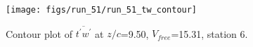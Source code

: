 \begin{figure}[H]
\centering
\texttt{[image: figs/run\_51/run\_51\_tw\_contour]}
\caption{Contour plot of $\overline{t^\prime w^\prime}$ at $z/c$=9.50, $V_{free}$=15.31, station 6.}
\label{fig:run_51_tw_contour}
\end{figure}



